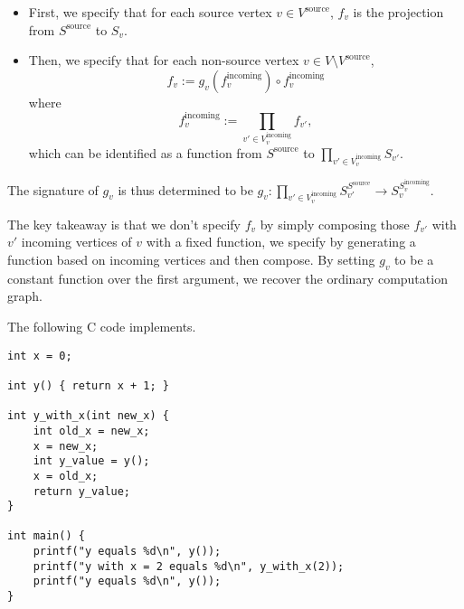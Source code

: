 \documentclass{article}
\begin{document}
\begin{itemize}
	\item First, we specify that for each source vertex $v\in V^{\text{source}}$, $f_v$ is the projection from $S^{\text{source}}$ to $S_v$.
	\item Then, we specify that for each non-source vertex $v\in V\setminus V^{\text{source}}$,
	      \begin{equation}
		      f_v:=g_v(f^{\text{incoming}}_v)\circ f^{\text{incoming}}_v
	      \end{equation}
	      where
	      \begin{equation}
		      f^{\text{incoming}}_v:=\prod_{v'\in V^{\text{incoming}}_v}f_{v'},
	      \end{equation}
	      which can be identified as a function from $S^{\text{source}}$ to $\prod_{v'\in V^{\text{incoming}}_v}S_{v'}$.
\end{itemize}

The signature of $g_v$ is thus determined to be $g_v:\prod\limits_{v'\in V^{\text{incoming}}_{v}}S_{v'}^{S^{\text{source}} }\rightarrow  S_v^{S^{\text{incoming}}_v}$.

The key takeaway is that we don't specify $f_v$ by simply composing those $f_{v'}$ with $v'$ incoming vertices of $v$ with a fixed function, we specify by generating a function based on incoming vertices and then compose. By setting $g_v$ to be a constant function over the first argument, we recover the ordinary computation graph.

The following C code implements.
\begin{verbatim}
int x = 0;

int y() { return x + 1; }

int y_with_x(int new_x) {
	int old_x = new_x;
	x = new_x;
	int y_value = y();
	x = old_x;
	return y_value;
}

int main() {
	printf("y equals %d\n", y());
	printf("y with x = 2 equals %d\n", y_with_x(2));
	printf("y equals %d\n", y());
}
\end{verbatim}

\end{document}
